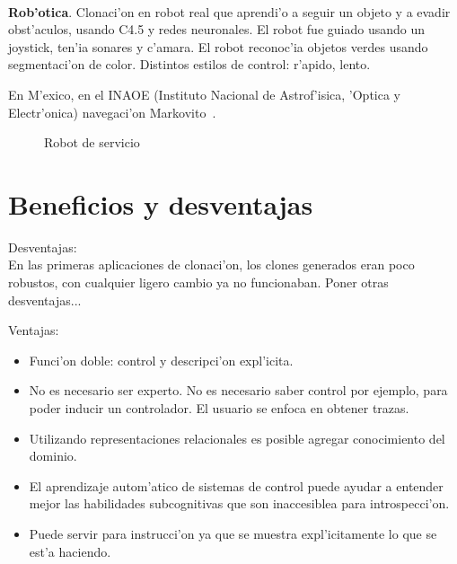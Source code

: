 \documentclass[11pt]{article}
\begin{document}
\paragraph{}
\noindent
\textbf{Rob'otica}. Clonaci'on en robot real que aprendi'o a seguir un objeto y a evadir obst'aculos, usando C4.5 y redes neuronales. El robot fue guiado usando un joystick, ten'ia sonares y c'amara. El robot reconoc'ia objetos verdes usando segmentaci'on de color. Distintos estilos de control: r'apido, lento. 

En M'exico, en el INAOE (Instituto Nacional de Astrof'isica, 'Optica y Electr'onica) navegaci'on Markovito~\cite{rljulioed, trps:icm09,mkvito:ieee}.


\begin{figure}[h]
\begin{center}

\caption{Robot de servicio}
  \label{fig:robotservicio}
\end{center}
\end{figure} 


\section{Beneficios y desventajas}

Desventajas:\\
En las primeras aplicaciones de clonaci'on, los clones generados eran poco robustos, con cualquier ligero cambio ya no funcionaban. Poner otras desventajas...

Ventajas:
\begin{itemize}
\item Funci'on doble: control y descripci'on expl'icita.
\item No es necesario ser experto. No es necesario saber control por ejemplo, para poder inducir un controlador. El usuario se enfoca en obtener trazas.
\item Utilizando representaciones relacionales es posible agregar conocimiento del dominio.
\item El aprendizaje autom'atico de sistemas de control puede ayudar a entender mejor las habilidades subcognitivas que son inaccesiblea para introspecci'on.
\item Puede servir para instrucci'on ya que se muestra expl'icitamente lo que se est'a haciendo.
\end{itemize}
\end{document}
